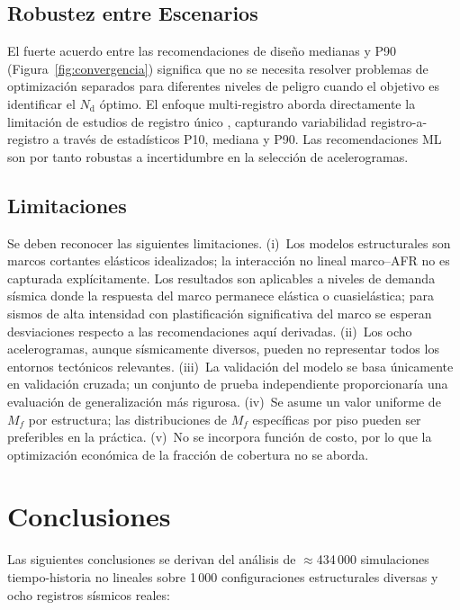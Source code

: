 \documentclass[preprint,12pt,authoryear]{elsarticle}
\newcommand{\nd}{N_{\mathrm{d}}}
\newcommand{\Mf}{M_{\!f}}
\begin{document}
\subsection{Robustez entre Escenarios}

El fuerte acuerdo entre las recomendaciones de diseño medianas y P90 
(Figura~\ref{fig:convergencia}) significa que no se necesita resolver problemas de optimización 
separados para diferentes niveles de peligro cuando el objetivo es identificar el $\nd$ óptimo. 
El enfoque multi-registro aborda directamente la limitación de estudios de registro único 
\citep{Jarrahi2020jbe,Jarrahi2020sdee}, capturando variabilidad registro-a-registro a través 
de estadísticos P10, mediana y P90. Las recomendaciones ML son por tanto robustas a 
incertidumbre en la selección de acelerogramas.

\subsection{Limitaciones}

Se deben reconocer las siguientes limitaciones. (i)~Los modelos estructurales son marcos 
cortantes elásticos idealizados; la interacción no lineal marco--AFR no es capturada 
explícitamente. Los resultados son aplicables a niveles de demanda sísmica donde la respuesta 
del marco permanece elástica o cuasielástica; para sismos de alta intensidad con plastificación 
significativa del marco se esperan desviaciones respecto a las recomendaciones aquí derivadas. 
(ii)~Los ocho acelerogramas, aunque sísmicamente diversos, pueden no representar todos los 
entornos tectónicos relevantes. (iii)~La validación del modelo se basa únicamente en validación 
cruzada; un conjunto de prueba independiente proporcionaría una evaluación de generalización 
más rigurosa. (iv)~Se asume un valor uniforme de $\Mf$ por estructura; las distribuciones de 
$\Mf$ específicas por piso pueden ser preferibles en la práctica. (v)~No se incorpora función 
de costo, por lo que la optimización económica de la fracción de cobertura no se aborda.

\section{Conclusiones}
\label{sec:conclusions}

Las siguientes conclusiones se derivan del análisis de $\approx$434\,000 simulaciones 
tiempo-historia no lineales sobre 1\,000 configuraciones estructurales diversas y ocho 
registros sísmicos reales:
\end{document}
